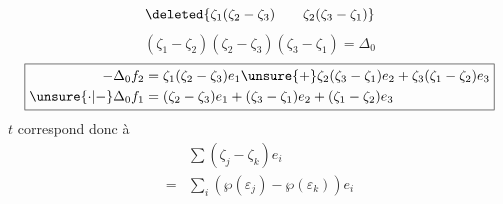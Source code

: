 \[
\deleted{\zeta_1(\zeta_2-\zeta_3)\qquad\zeta_2(\zeta_3-\zeta_1)}
\]
\[
(\zeta_1-\zeta_2)(\zeta_2-\zeta_3)(\zeta_3-\zeta_1)=\Delta_0
\]
\[
\boxed{\begin{aligned}
-\Delta_0f_2&=\zeta_1(\zeta_2-\zeta_3)e_1\unsure{+}\zeta_2(\zeta_3-\zeta_1)e_2+\zeta_3(\zeta_1-\zeta_2)e_3\\
\unsure{\cdot|-}\Delta_0f_1&=(\zeta_2-\zeta_3)e_1+(\zeta_3-\zeta_1)e_2+(\zeta_1-\zeta_2)e_3
\end{aligned}}
\]
$t$ correspond donc à
\[
\begin{aligned}
&\sum(\zeta_j-\zeta_k)e_i\\
={}&\sum_i(\wp(\varepsilon_j)-\wp(\varepsilon_k))e_i
\end{aligned}
\]
